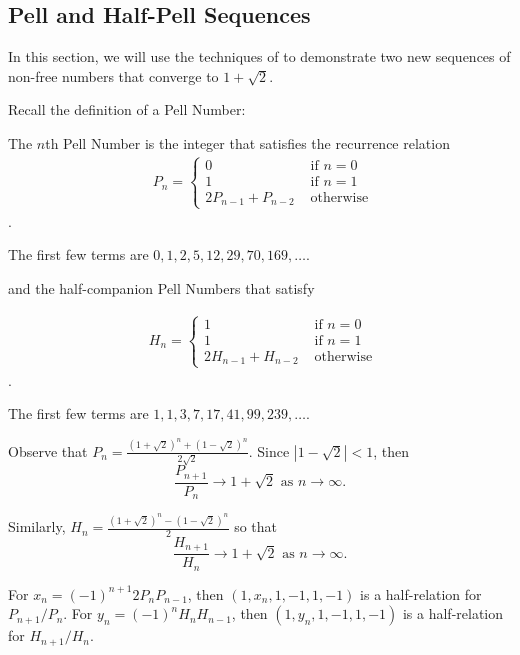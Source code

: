 \documentclass[11 pt]{amsart}
\begin{document}
\subsection{Pell and Half-Pell Sequences} \label{PellSection}

In this section, we will use the techniques of \cite{Smilga2021} to demonstrate two new sequences of non-free numbers that converge to $1 + \sqrt 2$. 


Recall the definition of a Pell Number:

    The $n$th Pell Number is the integer that satisfies the recurrence relation
    \begin{align*}
    &P_n = \begin{cases}
        0 & \text{\ if } n = 0 \\
        1 & \text{\ if } n = 1 \\
        2 P_{n-1} + P_{n-2} &\text{\ otherwise } 
    \end{cases}
    \end{align*}.

    The first few terms are $0, 1, 2, 5, 12, 29, 70, 169, \ldots$.

    and the half-companion Pell Numbers that satisfy 

    \begin{align*}
    &H_n = \begin{cases}
        1 & \text{\ if } n = 0 \\
        1 & \text{\ if } n = 1 \\
        2 H_{n-1} + H_{n-2} &\text{\ otherwise } 
    \end{cases}
    \end{align*}.

    The first few terms are $1, 1, 3, 7, 17, 41, 99, 239, \ldots$.

    Observe that $P_n = \frac{(1 + \sqrt2)^n + (1 - \sqrt{2})^n}{2 \sqrt{2}}$. Since $|1 - \sqrt{2}| < 1$, then \[\frac{P_{n+1}}{P_n}\to 1 + \sqrt{2} \text { as } n\to \infty.\]

    Similarly, $H_n = \frac{(1 + \sqrt{2})^n - (1 - \sqrt{2})^n}{2}$ so that \[\frac{H_{n+1}}{H_n}\to 1 + \sqrt{2} \text { as } n\to \infty.\]

    \begin{proposition}
        For $x_n = (-1)^{n+1} 2 P_n P_{n-1}$, then $(1, x_n, 1, -1, 1, -1)$ is a half-relation for $P_{n + 1}/ P_n$. For $y_n = (-1)^n H_n H_{n-1}$, then $(1, y_n, 1, -1, 1, -1)$ is a half-relation for $H_{n+1} / H_n$.
    \end{proposition}
\end{document}
